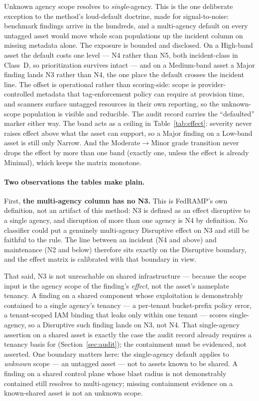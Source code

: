 \documentclass[11pt]{article}
\begin{document}
Unknown agency scope resolves to \emph{single}-agency. This is the one deliberate
exception to the method's loud-default doctrine, made for signal-to-noise: benchmark
findings arrive in the hundreds, and a multi-agency default on every untagged asset
would move whole scan populations up the incident column on missing metadata alone.
The exposure is bounded and disclosed. On a High-band asset the default costs one
level --- N4 rather than N5, both incident-class in Class~D, so prioritization
survives intact --- and on a Medium-band asset a Major finding lands N3 rather than
N4, the one place the default crosses the incident line. The offset is operational
rather than scoring-side: scope is provider-controlled metadata that tag-enforcement
policy can require at provision time, and scanners surface untagged resources in
their own reporting, so the unknown-scope population is visible and reducible. The
audit record carries the ``defaulted'' marker either way. The band acts as a ceiling in
Table~\ref{tab:effect}: severity never raises effect above what the asset can
support, so a Major finding on a Low-band asset is still only Narrow. And the
Moderate${}\rightarrow{}$Minor grade transition never drops the effect by more than
one band (exactly one, unless the effect is already Minimal), which keeps the matrix
monotone.

\paragraph{Two observations the tables make plain.} First, \textbf{the multi-agency
column has no N3.} This is FedRAMP's own definition, not an artifact of this method:
N3 is defined as an effect disruptive to a single agency, and disruption of more than
one agency is N4 by definition. No classifier could put a genuinely multi-agency
Disruptive effect on N3 and still be faithful to the rule. The line between an
incident (N4 and above) and maintenance (N2 and below) therefore sits exactly on the
Disruptive boundary, and the effect matrix is calibrated with that boundary in view.

That said, N3 is not unreachable on shared infrastructure --- because the scope input
is the agency scope of the finding's \emph{effect}, not the asset's nameplate tenancy.
A finding on a shared component whose exploitation is demonstrably contained to a
single agency's tenancy --- a per-tenant bucket-prefix policy error, a tenant-scoped
IAM binding that leaks only within one tenant --- scores single-agency, so a Disruptive
such finding lands on N3, not N4. That single-agency assertion on a shared asset is
exactly the case the audit record already requires a tenancy basis for
(Section~\ref{sec:audit}); the containment must be evidenced, not asserted. One
boundary matters here: the single-agency default applies to \emph{unknown} scope ---
an untagged asset --- not to assets known to be shared. A finding on a shared control
plane whose blast radius is not demonstrably contained still resolves to
multi-agency; missing containment evidence on a known-shared asset is not an unknown
scope.
\end{document}
